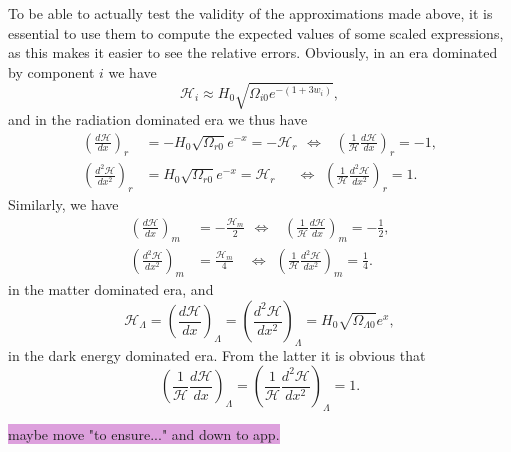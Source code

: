 \documentclass{aa}
\begin{document}
To be able to actually test the validity of the approximations made above, it is essential to use them to compute the expected values of some scaled expressions, as this makes it easier to see the relative errors. Obviously, in an era dominated by component $i$ we have
\begin{equation}
    \mathcal{H}_i \approx H_0\sqrt{\Omega_{i0}e^{-(1+3w_i)}},
\end{equation}
and in the radiation dominated era we thus have
\begin{align}
  \left(\frac{d\mathcal{H}}{dx}\right)_r &= -H_0\sqrt{\Omega_{r0}}e^{-x}=-\mathcal{H}_r 
  \hspace{5pt}\Leftrightarrow\hspace{9pt}\left(\frac{1}{\mathcal{H}}\frac{d\mathcal{H}}{dx}\right)_r=-1,
  \\
  \left(\frac{d^2\mathcal{H}}{dx^2}\right)_r &= H_0\sqrt{\Omega_{r0}}e^{-x}=\mathcal{H}_r
  \hspace{18pt}\Leftrightarrow\hspace{5pt}\left(\frac{1}{\mathcal{H}}\frac{d^2\mathcal{H}}{dx^2}\right)_r=1.
\end{align}
Similarly, we have
\begin{align}
  \left(\frac{d\mathcal{H}}{dx}\right)_m &= -\frac{\mathcal{H}_m}{2} 
  \hspace{5pt}\Leftrightarrow\hspace{10pt}\left(\frac{1}{\mathcal{H}}\frac{d\mathcal{H}}{dx}\right)_m=-\frac{1}{2},
  \\
  \left(\frac{d^2\mathcal{H}}{dx^2}\right)_m &= \frac{\mathcal{H}_m}{4}
  \hspace{12pt}\Leftrightarrow\hspace{5pt}\left(\frac{1}{\mathcal{H}}\frac{d^2\mathcal{H}}{dx^2}\right)_m=\frac{1}{4}.
\end{align}
in the matter dominated era, and
\begin{equation}
  \mathcal{H}_\Lambda = \left(\frac{d\mathcal{H}}{dx}\right)_\Lambda = \left(\frac{d^2\mathcal{H}}{dx^2}\right)_\Lambda = H_0\sqrt{\Omega_{\Lambda0}}e^{x},
\end{equation}
in the dark energy dominated era. From the latter it is obvious that
\begin{equation}
  \left(\frac{1}{\mathcal{H}}\frac{d\mathcal{H}}{dx}\right)_\Lambda = \left(\frac{1}{\mathcal{H}}\frac{d^2\mathcal{H}}{dx^2}\right)_\Lambda = 1.
\end{equation} 

\colorbox{Plum}{maybe move "to ensure..." and down to app.}
\end{document}
